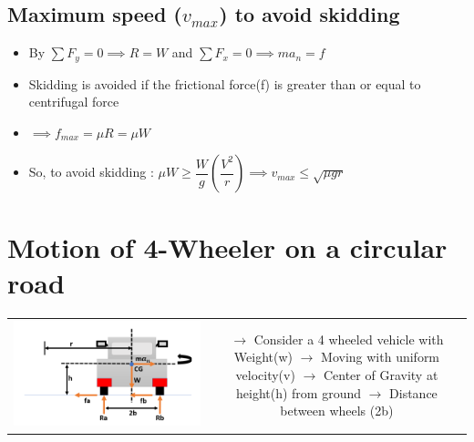\documentclass[8pt]{report}
\begin{document}
	\subsection{Maximum speed ($v_{max}$) to avoid skidding}
		\begin{itemize}
			\item By $\sum F_y = 0 \implies R = W$ and $\sum F_x=0 \implies ma_n=f$
			\item Skidding is avoided if the frictional force(f) is greater than or equal to centrifugal force
			\item $\implies f_{max} = \mu R = \mu W$
			\item So, to avoid skidding : $\mu W \geq \dfrac{W}{g}\left(\dfrac{V^2}{r}\right) \implies \boxed{v_{max}\le\sqrt{\mu gr}}$
		\end{itemize}\hrulefill
\section{Motion of 4-Wheeler on a circular road}
	\begin{table}[H]
		\begin{tabular}{cc}
			\parbox{4cm}{\includegraphics[scale=0.5]{4wheeler_circular.png}} & \hspace{5.8cm}
			\parbox{12cm}{$\rightarrow$ Consider a 4 wheeled vehicle with Weight(w)\\\\$\rightarrow$ Moving with uniform velocity(v)\\\\$\rightarrow$ Center of Gravity at height(h) from ground\\\\$\rightarrow$ Distance between wheels (2b)}
		\end{tabular}
	\end{table}
\end{document}

